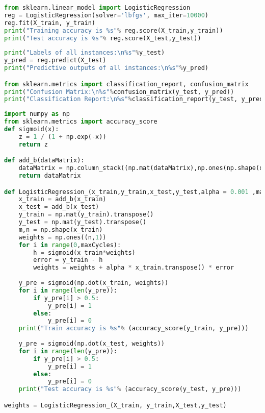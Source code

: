 \begin{lstlisting}[language=Python]
from sklearn.linear_model import LogisticRegression
reg = LogisticRegression(solver='lbfgs', max_iter=10000)
reg.fit(X_train, y_train)
print("Training accuracy is %s"% reg.score(X_train,y_train))
print("Test accuracy is %s"% reg.score(X_test,y_test))
\end{lstlisting}


\begin{lstlisting}[language=Python]
print("Labels of all instances:\n%s"%y_test)
y_pred = reg.predict(X_test)
print("Predictive outputs of all instances:\n%s"%y_pred)

from sklearn.metrics import classification_report, confusion_matrix
print("Confusion Matrix:\n%s"%confusion_matrix(y_test, y_pred))
print("Classification Report:\n%s"%classification_report(y_test, y_pred))
\end{lstlisting}

\begin{lstlisting}[language=Python]
import numpy as np
from sklearn.metrics import accuracy_score
def sigmoid(x):
    z = 1 / (1 + np.exp(-x))
    return z

def add_b(dataMatrix):
    dataMatrix = np.column_stack((np.mat(dataMatrix),np.ones(np.shape(dataMatrix)[0])))    
    return dataMatrix

def LogisticRegression_(x_train,y_train,x_test,y_test,alpha = 0.001 ,maxCycles = 500):
    x_train = add_b(x_train)
    x_test = add_b(x_test)
    y_train = np.mat(y_train).transpose()
    y_test = np.mat(y_test).transpose()
    m,n = np.shape(x_train)     
    weights = np.ones((n,1))
    for i in range(0,maxCycles):
        h = sigmoid(x_train*weights)
        error = y_train - h
        weights = weights + alpha * x_train.transpose() * error
        
    y_pre = sigmoid(np.dot(x_train, weights))
    for i in range(len(y_pre)):        
        if y_pre[i] > 0.5:
            y_pre[i] = 1
        else:
            y_pre[i] = 0
    print("Train accuracy is %s"% (accuracy_score(y_train, y_pre)))
    
    y_pre = sigmoid(np.dot(x_test, weights))
    for i in range(len(y_pre)):        
        if y_pre[i] > 0.5:
            y_pre[i] = 1
        else:
            y_pre[i] = 0
    print("Test accuracy is %s"% (accuracy_score(y_test, y_pre)))

weights = LogisticRegression_(X_train, y_train,X_test,y_test)
\end{lstlisting}

